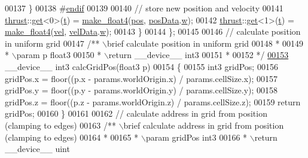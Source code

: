 \begin{DoxyCode}
00137         \}
00138 #\hyperlink{structintegrate__functor_a772e86ead8690332beb50911e4448f81}{endif}
00139 
00140         \textcolor{comment}{// store new position and velocity}
00141         \hyperlink{structintegrate__functor_a772e86ead8690332beb50911e4448f81}{thrust}::\hyperlink{structintegrate__functor_a772e86ead8690332beb50911e4448f81}{get}<0>(\hyperlink{structintegrate__functor_a772e86ead8690332beb50911e4448f81}{t}) = \hyperlink{structintegrate__functor_a772e86ead8690332beb50911e4448f81}{make\_float4}(\hyperlink{structintegrate__functor_a772e86ead8690332beb50911e4448f81}{pos}, 
      \hyperlink{structintegrate__functor_a772e86ead8690332beb50911e4448f81}{posData}.\hyperlink{structintegrate__functor_a772e86ead8690332beb50911e4448f81}{w});
00142         \hyperlink{structintegrate__functor_a772e86ead8690332beb50911e4448f81}{thrust}::\hyperlink{structintegrate__functor_a772e86ead8690332beb50911e4448f81}{get}<1>(\hyperlink{structintegrate__functor_a772e86ead8690332beb50911e4448f81}{t}) = \hyperlink{structintegrate__functor_a772e86ead8690332beb50911e4448f81}{make\_float4}(\hyperlink{structintegrate__functor_a772e86ead8690332beb50911e4448f81}{vel}, 
      \hyperlink{structintegrate__functor_a772e86ead8690332beb50911e4448f81}{velData}.\hyperlink{structintegrate__functor_a772e86ead8690332beb50911e4448f81}{w});
00143     \}
00144 \};
00145 
00146 \textcolor{comment}{// calculate position in uniform grid}
00147 \textcolor{comment}{/** \(\backslash\)brief calculate position in uniform grid}
00148 \textcolor{comment}{ *}
00149 \textcolor{comment}{ * \(\backslash\)param p float3}
00150 \textcolor{comment}{ * \(\backslash\)return \_\_device\_\_ int3}
00151 \textcolor{comment}{ *}
00152 \textcolor{comment}{ */}
\hypertarget{particles__kernel__impl_8cuh_source_l00153}{}\hyperlink{particles__kernel__impl_8cuh_a63d62750e6cbb8781c5ff252fc13c1fd}{00153} \_\_device\_\_ int3 calcGridPos(float3 p)
00154 \{
00155     int3 gridPos;
00156     gridPos.x = floor((p.x - params.worldOrigin.x) / params.cellSize.x);
00157     gridPos.y = floor((p.y - params.worldOrigin.y) / params.cellSize.y);
00158     gridPos.z = floor((p.z - params.worldOrigin.z) / params.cellSize.z);
00159     \textcolor{keywordflow}{return} gridPos;
00160 \}
00161 
00162 \textcolor{comment}{// calculate address in grid from position (clamping to edges)}
00163 \textcolor{comment}{/** \(\backslash\)brief calculate address in grid from position (clamping to edges)}
00164 \textcolor{comment}{ *}
00165 \textcolor{comment}{ * \(\backslash\)param gridPos int3}
00166 \textcolor{comment}{ * \(\backslash\)return \_\_device\_\_ uint}

\end{DoxyCode}
